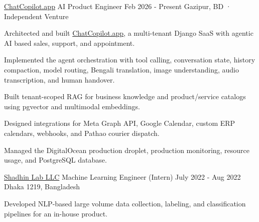 \begin{cventries}
\cventry
    {\href{https://chatcopilot.app/}{ChatCopilot.app}} %
    {AI Product Engineer} %
    {Feb 2026 - Present} %
    {Gazipur, BD · Independent Venture} %
    {
      \begin{cvitems}
        \item{Architected and built \href{https://chatcopilot.app/}{ChatCopilot.app}, a multi-tenant Django SaaS with agentic AI based sales, support, and appointment.}
        \item{Implemented the agent orchestration with tool calling, conversation state, history compaction, model routing, Bengali translation, image understanding, audio transcription, and human handover.}
        \item{Built tenant-scoped RAG for business knowledge and product/service catalogs using pgvector and multimodal embeddings.}
        \item{Designed integrations for Meta Graph API, Google Calendar, custom ERP calendars, webhooks, and Pathao courier dispatch.}
        \item{Managed the DigitalOcean production droplet, production monitoring, resource usage, and PostgreSQL database.}
      \end{cvitems}
    }


\cventry
    {\href{https://shadhinlab.com/}{Shadhin Lab LLC}} %
    {Machine Learning Engineer (Intern)} %
    {July 2022 - Aug 2022} %
    {Dhaka 1219, Bangladesh} %
    {
      \begin{cvitems}
        \item{Developed NLP-based large volume data collection, labeling, and classification pipelines for an in-house product.}
      \end{cvitems}
    }


\end{cventries}
